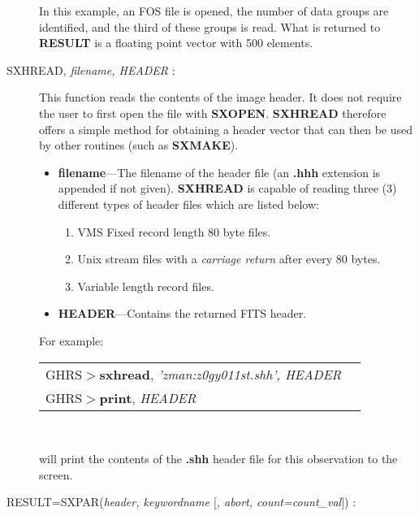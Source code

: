\begin{description}
\noindent
In 
this example, an FOS file is opened, the number of data groups are
identified, and the third of these groups is read.  What is returned to 
{\bf RESULT} is a floating point vector with 500 elements.

\item [SXHREAD, {\it filename, HEADER} : ] 

This function reads the contents of the image header.  It does not
require the user to first open the file with {\bf SXOPEN}. {\bf SXHREAD} 
therefore offers a simple method for obtaining a header vector that can then 
be used by other routines (such as {\bf SXMAKE}).

\begin{itemize}

\item {\bf filename}---The filename of the header file (an {\bf .hhh} extension is
appended if not given).  {\bf SXHREAD} is capable of reading 
three (3) different types of header files which are listed below:

\begin{enumerate}

\item VMS Fixed record length 80 byte files.

\item Unix stream files with a {\it carriage return} after every 80 bytes.

\item Variable length record files.

\end{enumerate}

\item {\bf HEADER}---Contains the returned FITS header.
\end{itemize}

\noindent
For example:\\

\begin{tabular}{ll}
GHRS$>${\bf sxhread}, {\it 'zman:z0gy011st.shh', HEADER} & \\
GHRS$>${\bf print}, {\it HEADER} & \\
\end{tabular}\\

\noindent

will print the contents of the {\bf .shh} header file for this 
observation to the screen.

\item [RESULT=SXPAR({\it header, keywordname $[$, abort, count=count\_val$]$}) :] 


\end{description}
